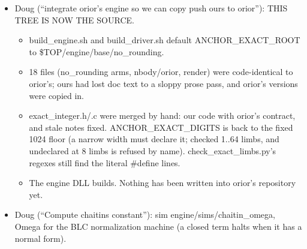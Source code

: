 \begin{enumerate}
\begin{itemize}
\begin{itemize}
\begin{itemize}
\item Wired through engine\_\allowbreak{}config.h, keymath imprint (bits: quotient = left, remainder = min, gcd = max), key\_\allowbreak{}schedule refs, cycle.c (host, the library itself) and cycle.cu (device Knuth D, Euclid, and multiply-and-mask on the register arrays).
\item The kernel is templated <WIDE, DIVIDES>: only a dividing program carries 5·WIDE+4 limbs of scratch.
\item test/engine/record\_\allowbreak{}divide\_\allowbreak{}test passes 15/0: device = host word for word in the 64- and 256-limb files, with identities, exact factors, refusals and imprint order. record\_\allowbreak{}table\_\allowbreak{}test still passes.
\end{itemize}
\item Doug (“integrate orior's engine so we can copy push ours to orior”): THIS TREE IS NOW THE SOURCE.

\begin{itemize}
\item build\_\allowbreak{}engine.sh and build\_\allowbreak{}driver.sh default ANCHOR\_\allowbreak{}EXACT\_\allowbreak{}ROOT to \$TOP/engine/base/no\_\allowbreak{}rounding.
\item 18 files (no\_\allowbreak{}rounding arms, nbody/orior, render) were code-identical to orior's; ours had lost doc text to a sloppy prose pass, and orior's versions were copied in.
\item exact\_\allowbreak{}integer.h/.c were merged by hand: our code with orior's contract, and stale notes fixed. ANCHOR\_\allowbreak{}EXACT\_\allowbreak{}DIGITS is back to the fixed 1024 floor (a narrow width must declare it; checked 1..64 limbs, and undeclared at 8 limbs is refused by name). check\_\allowbreak{}exact\_\allowbreak{}limbs.py's regexes still find the literal \#define lines.
\item The engine DLL builds. Nothing has been written into orior's repository yet.
\end{itemize}
\item Doug (“Compute chaitins constant”): sim engine/sims/chaitin\_\allowbreak{}omega, Omega for the BLC normalization machine (a closed term halts when it has a normal form).


\end{itemize}
\end{itemize}
\end{enumerate}

